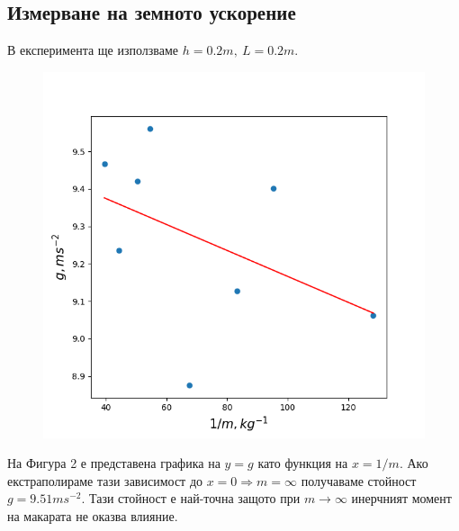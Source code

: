 \documentclass[aps, prb, twocolumn, a4paper, floatfix, reprint]{revtex4-2}
\begin{document}
\subsection{Измерване на земното ускорение}
В експеримента ще използваме $h=0.2m, \  L=0.2m$. 
\begin{figure}[H]
    \centering
    \includegraphics[width=\columnwidth, keepaspectratio=true]{Figure_2.png}
\end{figure}
На Фигура 2 е представена графика на $y=g$ като функция на $x=1/m$. Ако екстраполираме тази зависимост до $x=0 \Rightarrow m=\infty$ получаваме стойност $g=9.51 ms^{-2}$. Тази стойност е най-точна защото при $m \rightarrow \infty$ инерчният момент на макарата не оказва влияние. 
\end{document}
